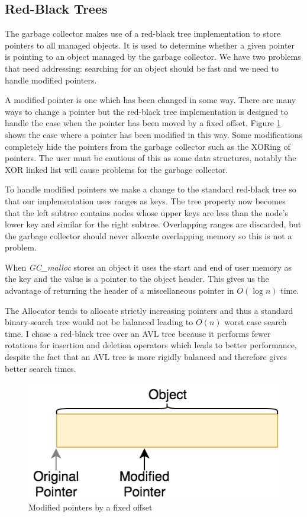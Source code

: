 \documentclass[../diss.tex]{subfiles}
\begin{document}
\subsection{Red-Black Trees} \label{sec:rbtree}

The garbage collector makes use of a red-black tree implementation to store pointers to all managed objects. It is used to determine whether a given pointer is pointing to an object managed by the garbage collector. We have two problems that need addressing: searching for an object should be fast and we need to handle modified pointers.

A modified pointer is one which has been changed in some way. There are many ways to change a pointer but the red-black tree implementation is designed to handle the case when the pointer has been moved by a fixed offset. Figure \ref{fig:modifiedpointers} shows the case where a pointer has been modified in this way. Some modifications completely hide the pointers from the garbage collector such as the XORing of pointers. The user must be cautious of this as some data structures, notably the XOR linked list will cause problems for the garbage collector.


To handle modified pointers we make a change to the standard red-black tree so that our implementation uses ranges as keys. The tree property now becomes that the left subtree contains nodes whose upper keys are less than the node's lower key and similar for the right subtree. Overlapping ranges are discarded, but the garbage collector should never allocate overlapping memory so this is not a problem.

When \emph{GC\_malloc} stores an object it uses the start and end of user memory as the key and the value is a pointer to the object header. This gives us the advantage of returning the header of a miscellaneous pointer in $O(\log n)$ time.

The Allocator tends to allocate strictly increasing pointers and thus a standard binary-search tree would not be balanced leading to $O(n)$ worst case search time. I chose a red-black tree over an AVL tree because it performs fewer rotations for insertion and deletion operators which leads to better performance, despite the fact that an AVL tree is more rigidly balanced and therefore gives better search times.

\begin{figure}
    \centering
    \includegraphics[max width=0.7\linewidth]{figs/modifiedpointers.png}
    \caption{Modified pointers by a fixed offset}
    \label{fig:modifiedpointers}
\end{figure}
\end{document}
